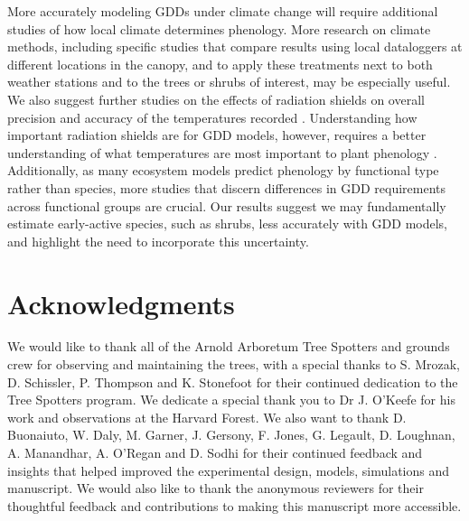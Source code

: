 \documentclass{article}\usepackage[]{graphicx}\usepackage[]{color}
\begin{document}
More accurately modeling GDDs under climate change will require additional studies of how local climate determines phenology. More research on climate methods, including specific studies that compare results using local dataloggers at different locations in the canopy, and to apply these treatments next to both weather stations and to the trees or shrubs of interest, may be especially useful. We also suggest further studies on the effects of radiation shields on overall precision and accuracy of the temperatures recorded \citep{daCunha2015}. Understanding how important radiation shields are for GDD models, however, requires a better understanding of what temperatures are most important to plant phenology \citep[e.g., bud temperature, including influences of bud color and structure and their interaction with solar radiation, versus air temperature,][]{Vitasse2021}. Additionally, as many ecosystem models predict phenology by functional type rather than species, more studies that discern differences in GDD requirements across functional groups are crucial. Our results suggest we may fundamentally estimate early-active species, such as shrubs, less accurately with GDD models, and highlight the need to incorporate this uncertainty. 


\section*{Acknowledgments}
We would like to thank all of the Arnold Arboretum Tree Spotters and grounds crew for observing and maintaining the trees, with a special thanks to S. Mrozak, D. Schissler, P. Thompson and K. Stonefoot for their continued dedication to the Tree Spotters program. We dedicate a special thank you to Dr J. O'Keefe for his work and observations at the Harvard Forest. We also want to thank D. Buonaiuto, W. Daly, M. Garner, J. Gersony, F. Jones, G. Legault, D. Loughnan, A. Manandhar, A. O'Regan and D. Sodhi for their continued feedback and insights that helped improved the experimental design, models, simulations and manuscript. We would also like to thank the anonymous reviewers for their thoughtful feedback and contributions to making this manuscript more accessible. 
\end{document}
